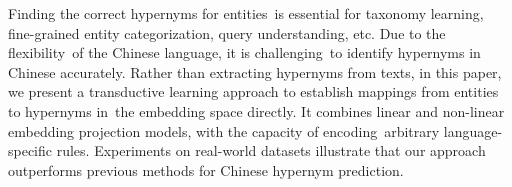 Finding the correct hypernyms for entities is essential for taxonomy learning, fine-grained entity categorization, query understanding, etc. Due to the flexibility of the Chinese language, it is challenging to identify hypernyms in Chinese accurately. Rather than extracting hypernyms from texts, in this paper, we present a transductive learning approach to establish mappings from entities to hypernyms in the embedding space directly. It combines linear and non-linear embedding projection models, with the capacity of encoding arbitrary language-specific rules. Experiments on real-world datasets illustrate that our approach outperforms previous methods for Chinese hypernym prediction.
